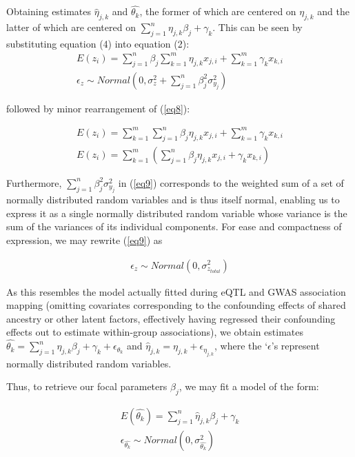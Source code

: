 \documentclass[12pt]{article}
\begin{document}
Obtaining estimates $\hat{\eta}_{j,k}$ and $\hat{\theta_k}$, the former of which are centered on $\eta_{j,k}$ and the latter of which are centered on $\sum_{j=1}^{n}\eta_{j,k}\beta_j + \gamma_k$. This can be seen by substituting equation (4) into equation (2):
\begin{align}
E(z_i) = \sum_{j=1}^{n}\beta_j\sum_{k=1}^{m}\eta_{j,k}x_{j,i} + \sum_{k=1}^{m}\gamma_{k}x_{k,i} \label{eq8}\\
\epsilon_{z} \sim Normal(0,\sigma_{z}^2 + \sum_{j=1}^{n}\beta_j^2\sigma_{y_j}^2) \label{eq9}
\end{align}

followed by minor rearrangement of (\ref{eq8}):

\begin{align}
E(z_i) = \sum_{k=1}^{m}\sum_{j=1}^{n}\beta_j\eta_{j,k}x_{j,i} + \sum_{k=1}^{m}\gamma_{k}x_{k,i} \label{eq10}\\
E(z_i) = \sum_{k=1}^{m}(\sum_{j=1}^{n}\beta_j\eta_{j,k}x_{j,i} + \gamma_{k}x_{k,i}) \label{eq11}
\end{align}

Furthermore, $\sum_{j=1}^{n}\beta_j^2\sigma_{y_j}^2$ in (\ref{eq9}) corresponds to the weighted sum of a set of normally distributed random variables and is thus itself normal, enabling us to express it as a single normally distributed random variable whose variance is the sum of the variances of its individual components. For ease and compactness of expression, we may rewrite (\ref{eq9}) as

\begin{align}
\epsilon_{z} \sim Normal(0,\sigma_{z_{total}}^2) \label{eq9alt}
\end{align}

As this resembles the model actually fitted during eQTL and GWAS association mapping (omitting covariates corresponding to the confounding effects of shared ancestry or other latent factors, effectively having regressed their confounding effects out to estimate within-group associations), we obtain estimates $\hat{\theta_{k}} = \sum_{j=1}^{n}\eta_{j,k}\beta_j + \gamma_k + \epsilon_{\theta_k}$ and $\hat{\eta}_{j,k} = \eta_{j,k} + \epsilon_{\eta_{j,k}}$, where the `$\epsilon$'s represent normally distributed random variables.

Thus, to retrieve our focal parameters $\beta_j$, we may fit a model of the form:

\begin{align}
E(\hat{\theta_{k}}) = \sum_{j=1}^{n}\hat{\eta}_{j,k}\beta_j + \gamma_{k} \label{eq13}\\
\epsilon_{\hat{\theta_{k}}} \sim Normal(0,\sigma_{\hat{\theta_{k}}}^2) \label{eq14}
\end{align}
\end{document}
